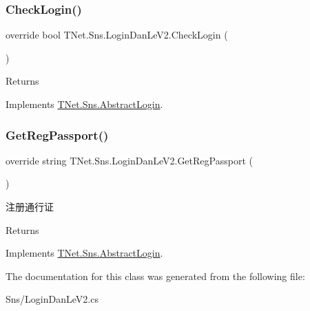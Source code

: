 \subsubsection{\texorpdfstring{Check\+Login()}{CheckLogin()}}
{\footnotesize\ttfamily override bool T\+Net.\+Sns.\+Login\+Dan\+Le\+V2.\+Check\+Login (\begin{DoxyParamCaption}{ }\end{DoxyParamCaption})\hspace{0.3cm}{\ttfamily [virtual]}}





\begin{DoxyReturn}{Returns}

\end{DoxyReturn}


Implements \mbox{\hyperlink{class_t_net_1_1_sns_1_1_abstract_login_a6b5dac3d6d46efb7b1e4049e674105e5}{T\+Net.\+Sns.\+Abstract\+Login}}.

\mbox{\label{class_t_net_1_1_sns_1_1_login_dan_le_v2_a10382c3e563022d2f0c4f37769f35107}} 
\subsubsection{\texorpdfstring{Get\+Reg\+Passport()}{GetRegPassport()}}
{\footnotesize\ttfamily override string T\+Net.\+Sns.\+Login\+Dan\+Le\+V2.\+Get\+Reg\+Passport (\begin{DoxyParamCaption}{ }\end{DoxyParamCaption})\hspace{0.3cm}{\ttfamily [virtual]}}



注册通行证 

\begin{DoxyReturn}{Returns}

\end{DoxyReturn}


Implements \mbox{\hyperlink{class_t_net_1_1_sns_1_1_abstract_login_a3930eb564bb4804e1b646d749f20907a}{T\+Net.\+Sns.\+Abstract\+Login}}.



The documentation for this class was generated from the following file\+:\begin{DoxyCompactItemize}
\item 
Sns/Login\+Dan\+Le\+V2.\+cs\end{DoxyCompactItemize}

